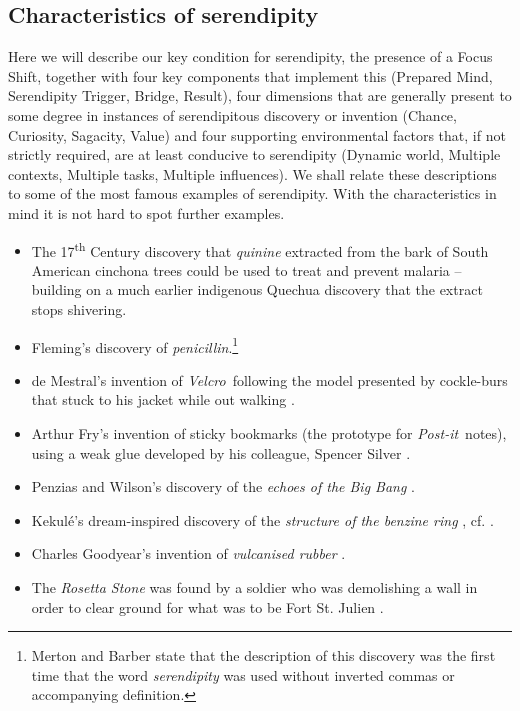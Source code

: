 \documentclass{llncs}
\begin{document}
\subsection{Characteristics of serendipity}\label{sec:characteristics}

Here we will describe our key condition for serendipity, the presence
of a Focus Shift, together with four key components that implement
this (Prepared Mind, Serendipity Trigger, Bridge, Result), four
dimensions that are generally present to some degree in instances of
serendipitous discovery or invention (Chance, Curiosity, Sagacity,
Value) and four supporting environmental factors that, if not strictly
required, are at least conducive to serendipity (Dynamic world,
Multiple contexts, Multiple tasks, Multiple influences). We shall relate these descriptions to some of the most famous examples of serendipity.
With the characteristics in mind it is not hard to spot further examples.

\begin{itemize}
\item The 17\textsuperscript{th} Century discovery that \emph{quinine} extracted from
  the bark of South American cinchona trees could be used to treat and
  prevent malaria -- building on a much earlier indigenous Quechua
  discovery that the extract stops shivering.
\item Fleming's discovery of {\em penicillin}.\footnote{Merton and
  Barber \cite{merton} state that the description of this discovery
  was the first time that the word \emph{serendipity} was used without
  inverted commas or accompanying definition.}
\item de Mestral's invention of {\em Velcro}\texttrademark\ following
  the model presented by cockle-burs that stuck to his jacket while
  out walking \cite[pp 220-222]{roberts}.
\item Arthur Fry's invention of sticky bookmarks (the prototype for
  {\em Post-it}\texttrademark\ notes), using a weak glue developed by
  his colleague, Spencer Silver \cite[p. 224]{roberts}.
\item Penzias and Wilson's discovery of the {\em echoes of the Big
  Bang} \cite{singh2004big}.
\item Kekul\'e's dream-inspired discovery of the {\em structure of the
  benzine ring} \cite[p. 21]{benfey}, cf. \cite[p. 77]{roberts}.
\item Charles Goodyear's invention of {\em vulcanised rubber}
  \cite{goodyear1855gum}.
\item The {\em Rosetta Stone} was found by a soldier who was
  demolishing a wall in order to clear ground for what was to be Fort
  St. Julien \cite[pp. 109 - 111]{roberts}.
\end{itemize}
\end{document}
